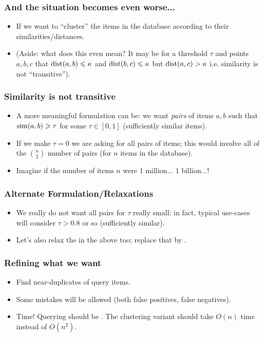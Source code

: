 \documentclass{beamer}
\begin{document}
\begin{frame}
\frametitle{And the situation becomes even worse...}
\begin{itemize}
\item If we want to ``cluster'' the items in the database according to their similarities/distances. 
\pause 
\item (Aside: what does this even mean? It may be for a threshold $\tau$ and points $a, b, c$ that $\mathrm{dist}(a, b) \leqslant \kappa$ and $\mathrm{dist}(b, c) \leqslant \kappa$ but $\mathrm{dist}(a, c) > \kappa$ i.e. similarity is not ``transitive'').
\end{itemize}
\end{frame}

\begin{frame}
\frametitle{Similarity is not transitive}
\begin{itemize}
\item A more meaningful formulation can be: we want  {\em pairs} of items $a, b$ such that $\mathrm{sim}(a, b)\geqslant \tau$ for some $\tau \in [0, 1]$ (sufficiently similar items).
\pause
\item If we make $\tau = 0$ we are asking for all pairs of items; this would involve all of the $\binom{n}{2}$ number of pairs (for $n$ items in the database).
\pause
\item Imagine if the number of items $n$ were \pause $1$ million... \pause $1$ billion...!
\end{itemize}
\end{frame}

\begin{frame}
\frametitle{Alternate Formulation/Relaxations}
\begin{itemize}
\item We really do not want all pairs for $\tau$ really small; in fact, typical use-cases will consider $\tau > 0.8$ or so (sufficiently similar).
\item Let's also relax the  in the above too; replace that by .
\end{itemize}
\end{frame}

\begin{frame}
\frametitle{Refining what we want}
\begin{itemize}
\item Find near-duplicates of query items.
\item Some mistakes will be allowed (both false positives, false negatives). 
\item Time! Querying should be . The clustering variant should take $O(n)$ time instead of $O(n^2)$. 
\end{itemize}
\end{frame}
\end{document}
